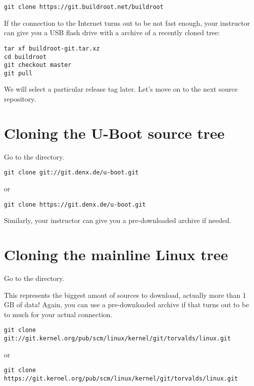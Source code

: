 \begin{verbatim}
git clone https://git.buildroot.net/buildroot
\end{verbatim}

If the connection to the Internet turns out to be not fast enough,
your instructor can give you a USB flash drive with a
 archive of a recently cloned tree:

\begin{verbatim}
tar xf buildroot-git.tar.xz
cd buildroot
git checkout master
git pull
\end{verbatim}

We will select a particular release tag later. Let's move on to the next
source repository.

\section{Cloning the U-Boot source tree}

Go to the  directory.

\begin{verbatim}
git clone git://git.denx.de/u-boot.git
\end{verbatim}

or

\begin{verbatim}
git clone https://git.denx.de/u-boot.git
\end{verbatim}

Similarly, your instructor can give you a pre-downloaded archive if
needed.

\section{Cloning the mainline Linux tree}

Go to the  directory.

This represents the biggest amout of sources to download, actually more
than 1 GB of data! Again, you can use a pre-downloaded archive if that
turns out to be to much for your actual connection.

{\small
\begin{verbatim}
git clone git://git.kernel.org/pub/scm/linux/kernel/git/torvalds/linux.git
\end{verbatim}
}

or

{\small
\begin{verbatim}
git clone https://git.kernel.org/pub/scm/linux/kernel/git/torvalds/linux.git
\end{verbatim}
}

